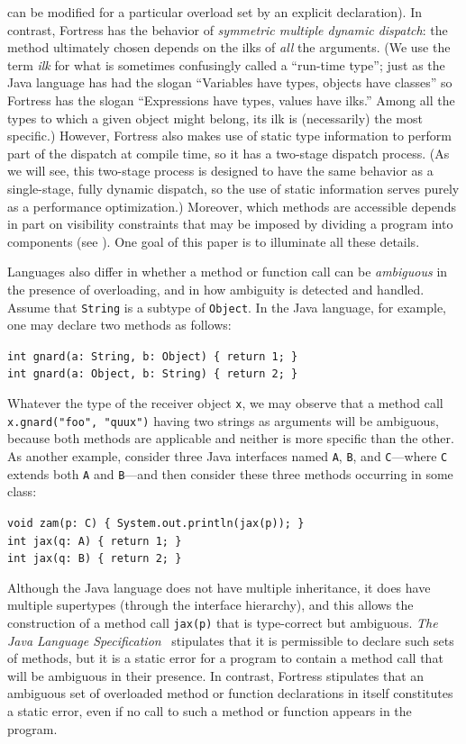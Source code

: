 can be modified for a particular overload set by an explicit declaration).
In contrast, Fortress has the behavior of \emph{symmetric multiple dynamic dispatch}:
the method ultimately chosen depends on the ilks of \emph{all} the arguments.
(We use the term \emph{ilk} for what is sometimes confusingly called a ``run-time type'';
just as the Java language has had the slogan ``Variables have types, objects have classes'' \cite[\S 4.5.5]{JLS1}
so Fortress has the slogan ``Expressions have types, values have ilks.''
Among all the types to which a given object might belong, its ilk
is (necessarily) the most specific.)
However, Fortress also makes use of static type information to perform part of the
dispatch at compile time, so it has a two-stage dispatch process.
(As we will see, this two-stage process is designed to have
the same behavior as a single-stage, fully dynamic dispatch,
so the use of static information serves purely as a performance optimization.)
Moreover, which methods are accessible depends in part
on visibility constraints that may be imposed by dividing a program
into components (see ).
One goal of this paper is to illuminate all these details.

Languages also differ in whether a method or function call can be \emph{ambiguous}
in the presence of overloading, and in how ambiguity is detected and handled.
Assume that {\tt String} is a subtype of {\tt Object}.
In the Java language, for example, one may declare two methods as follows:
\begin{tabbing}
{\tt int gnard(a:~String, b:~Object) \{ return 1; \}} \\
{\tt int gnard(a:~Object, b:~String) \{ return 2; \}}
\end{tabbing}
Whatever the type of the receiver object {\tt x},
we may observe that a method call {\tt x.gnard("foo", "quux")}
having two strings as arguments will be ambiguous, because both methods
are applicable and neither is more specific than the other.  As another example,
consider three Java interfaces named {\tt A}, {\tt B}, and {\tt C}---where
{\tt C} extends both {\tt A} and {\tt B}---and then consider these three methods
occurring in some class:
\begin{tabbing}
{\tt void zam(p: C) \{ System.out.println(jax(p)); \}} \\
{\tt int jax(q: A) \{ return 1; \}} \\
{\tt int jax(q: B) \{ return 2; \}}
\end{tabbing}
Although the Java language does not have multiple inheritance, it does have multiple
supertypes (through the interface hierarchy), and this allows the
construction of a method call {\tt jax(p)} that is type-correct but ambiguous.
{\it The Java Language Specification}~\cite[\S 15.11.2.2]{JLS1} stipulates that it is permissible
to declare such sets of methods, but it is a static error for a program
to contain a method call that will be ambiguous in their presence.
In contrast, Fortress stipulates that an ambiguous set of overloaded method or function
declarations in itself constitutes a static error, even if no call to such a method
or function appears in the program.

